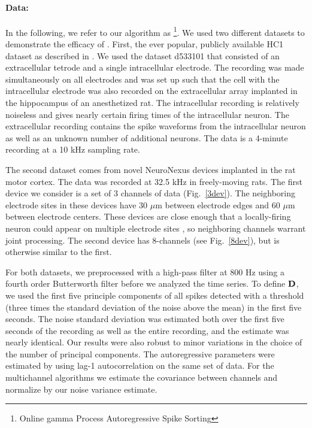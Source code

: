 
\paragraph{Data:}

In the following, we refer to our algorithm as \smug\footnote{Online gamma Process Autoregressive Spike Sorting}.
We used two different datasets to demonstrate the efficacy of \smug.  First, the ever popular, publicly available HC1 dataset %
as described in \cite{Henze2000}.  We used the dataset d533101 that consisted of an extracellular tetrode and a single intracellular electrode.  The recording was made simultaneously on all electrodes and was set up such that the cell with the intracellular electrode was also recorded on the extracellular array implanted in the hippocampus of an anesthetized rat. The intracellular recording is relatively noiseless and gives nearly certain firing times of the intracellular neuron.  The extracellular recording contains the spike waveforms from the intracellular neuron as well as an unknown number of additional neurons.  The data is a 4-minute recording at a 10 kHz sampling rate.  

The second dataset comes from novel NeuroNexus devices implanted in the rat motor cortex.  The data was recorded at 32.5 kHz in freely-moving rats.  The first device we consider is a set of 3 channels of data (Fig.\ \ref{3dev}).  The neighboring electrode sites in these devices have 30 $\mu$m between electrode edges and 60 $\mu$m between electrode centers.  These devices are close enough that a locally-firing neuron could appear on multiple electrode sites \cite{Prentice2011}, so neighboring channels warrant joint processing.  The second device has 8-channels (see Fig.\ \ref{8dev}), but is otherwise similar to the first.


For both datasets, we preprocessed with a high-pass filter at 800 Hz using a fourth order Butterworth filter before we analyzed the time series.  To 
define $\mathbf{D}$, we used the first five principle components of all spikes detected with a threshold (three times the standard deviation of the noise above the mean) in the first five seconds.  The noise standard deviation was estimated both over the first five seconds of the recording as well as the entire recording, and the estimate was nearly identical.  Our results were also robust to minor variations in the choice of the number of principal components.  The autoregressive parameters were estimated by using lag-1 autocorrelation on the same set of data.  For the multichannel algorithms we estimate the covariance between channels and normalize by our noise variance estimate.


